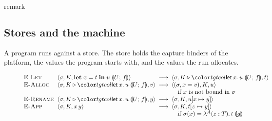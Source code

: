 
\ifcsname remark\endcsname\else
  \theoremstyle{acmdefinition}\newtheorem{remark}[theorem]{Remark}
  \theoremstyle{acmplain}
\fi

\FloatBarrier
\subsection{Stores and the machine}\label{sec:mini-machine}

A program runs against a store. The store holds the capture binders of the platform, the values the program starts with, and the values the run allocates.

\begin{figure}[t]
\small
\color{tgtcol}
\[
\begin{array}{@{}p{5.5em}@{}l@{\enspace}c@{\enspace}l@{}}
\rn{E-Let} & \mst{\sigma}{K}{\letc{x}{t}{u}{U}{f}} & \step & \mst{\sigma}{K \triangleright \frlet{x}{u}{U}{f}}{t} \\
\rn{E-Alloc} & \mst{\sigma}{K \triangleright \frlet{x}{u}{U}{f}}{v} & \step & \mst{(\sigma, x = v)}{K}{u} \\
& & & \quad \text{if } x \text{ is not bound in } \sigma \\
\rn{E-Rename} & \mst{\sigma}{K \triangleright \frlet{x}{u}{U}{f}}{y} & \step & \mst{\sigma}{K}{u[x \mapsto y]} \\
\rn{E-App} & \mst{\sigma}{K}{x\,y} & \step & \mst{\sigma}{K}{t[z \mapsto y]} \\
& & & \quad \text{if } \sigma(x) = \lamc{A}{z}{T}{t}{g}

\end{array}\]
\end{figure}
